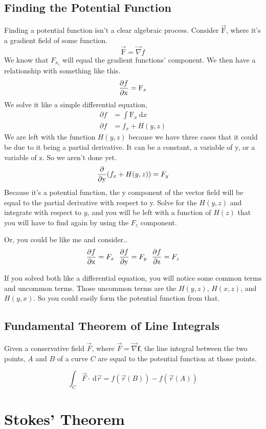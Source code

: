 \vspace{30pt}\subsection{Finding the Potential Function}
Finding a potential function isn't a clear algebraic process. Consider $\vec{\mathrm{F}}$, where it's a gradient field of some function.
\begin{equation*}
	\vec{\mathrm{F}} = \vec{\nabla}f 
\end{equation*}
We know that $F_{x_i}$ will equal the gradient functions' component. We then have a relationship with something like this.
\begin{equation*}
	\frac{\partial f}{\partial\mathrm{x}} = {\mathrm{F}}_x 
\end{equation*} 
We solve it like a simple differential equation, 
\begin{align*}
	\partial f &= \int \mathrm{F}_x \: \mathrm{d}x \\
	\partial f &= f_x + H(y,z)
\end{align*}
We are left with the function $H(y,z)$ because we have three cases that it could be due to it being a partial derivative. It can be a constant, a variable of y, or a variable of z. So we aren't done yet.
\begin{equation*}
	\frac{\partial }{\partial\mathrm{y}} (f_x + H(y,z)) = F_y
\end{equation*}
Because it's a potential function, the y component of the vector field will be equal to the partial derivative with respect to y. Solve for the $H(y,z)$ and integrate with respect to $y$, and you will be left with a function of $H(z)$ that you will have to find again by using the $F_z$ component.

\vspace{5pt}
Or, you could be like me and consider.. 
\begin{equation*}
	\frac{\partial f}{\partial\mathrm{x}} = F_x \:\:\: \frac{\partial f}{\partial\mathrm{y}}=F_y \:\:\: \frac{\partial f}{\partial\mathrm{z}} =F_z 
\end{equation*} 

If you solved both like a differential equation, you will notice some common terms and uncommon terms. Those uncommon terms are the $H(y,z)$, $H(x,z)$, and $H(y,x)$. So you could easily form the potential function from that.

\subsection{Fundamental Theorem of Line Integrals}
{
	Given a conservative field $\vec{F}$, where $\vec{F} = \vec{\nabla}\mathbf{f}$, the line integral between the two points, $A$ and $B$ of a curve $C$ are equal to the potential function at those points. 

	\begin{equation*}
		\int_C \vec{F} \cdot \: \mathrm{d}\vec{r} = f(\vec{r}(B)) - f(\vec{r}(A))
	\end{equation*}
}
\pagebreak
\section{Stokes' Theorem}